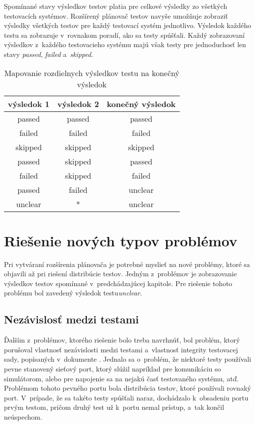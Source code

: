 Spomínané stavy výsledkov testov platia pre celkové výsledky zo všetkých testovacích systémov. Rozšírený plánovač testov navyše umožňuje zobraziť 
výsledky všetkých testov pre každý testovací systém jednotlivo. Výsledok každého testu sa zobrazuje v~rovnakom poradí, ako sa testy spúšťali.
Každý zobrazovaní výsledkov z~každého testovacieho systému majú však testy pre jednoduchosť len stavy \emph{passed}, \emph{failed} a~\emph{skipped}. 

\begin{table}
  \begin{center}
    \begin{tabular}{| c | c | c |}
    \hline
    výsledok 1  & výsledok 2 & konečný výsledok \\ \hline
    passed      & passed     & passed  \\ \hline
    failed      & failed     & failed  \\ \hline
    skipped     & skipped    & skipped \\ \hline
    passed      & skipped    & passed  \\ \hline
    failed      & skipped    & failed  \\ \hline
    passed      & failed     & unclear \\ \hline
    unclear     &      *     & unclear \\ 
    \hline
    \end{tabular}
    \label{table:vysledky_testu_prevod}
    \caption{Mapovanie rozdielnych výsledkov testu na konečný výsledok}
  \end{center}
\end{table}



\section{Riešenie nových typov problémov}
\label{sekcia:riesenie_problemov}
Pri vytváraní rozšírenia plánovača je potrebné myslieť na nové problémy, ktoré sa objavili
až pri riešení distribúcie testov. Jedným z~problémov je zobrazovanie výsledkov testov spomínané v~predchádzajúcej kapitole.
Pre riešenie tohoto problému bol zavedený výsledok testu\emph{unclear}.

\subsection*{Nezávislosť medzi testami}
Ďalším z~problémov, ktorého riešenie bolo treba navrhnúť, bol problém, ktorý porušoval vlastnosť nezávislosti 
medzi testami a~vlastnosť integrity testovacej sady, popísaných v~dokumente \cite{Kapfhammer}.
Jednalo sa o~problém, že niektoré testy používali pevne stanovený sieťový port, ktorý slúžil napríklad pre
komunikáciu so simulátorom, alebo pre napojenie sa na nejakú časť testovaného systému, atď.
Problémom tohoto pevného portu bola distribúcia testov, ktoré používali rovnaký port.
V~prípade, že sa takéto testy spúšťali naraz, dochádzalo k~obsadeniu portu prvým testom, pričom druhý test 
už k~portu nemal prístup, a~tak končil neúspechom.

